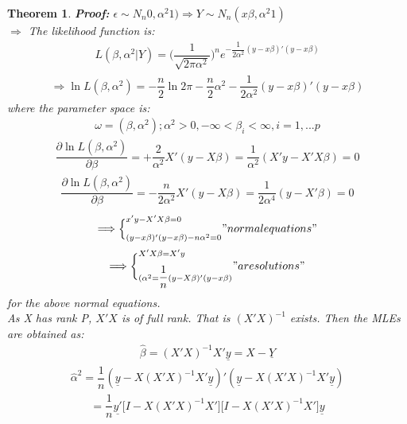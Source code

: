 \documentclass[12pt]{article}
\newtheorem{theorem}{\bf{Theorem}}[section]
\numberwithin{equation}{section}
\begin{document}
\begin{theorem}
\textbf{Proof:}  $\epsilon \sim N_{n}{0},\alpha^{2}1) \Longrightarrow {Y} \sim N_{n}(x{\beta},\alpha^{2}1)$ \\
$\Longrightarrow$ The likelihood function is:
\begin{eqnarray*}
L({\beta}, \alpha^{2}| {Y}) = \Big(\dfrac{1}{\sqrt{2\pi\alpha^{2}}}\Big)^{n}e^{-\dfrac{1}{2\alpha^{2}}({y}-x{\beta})'({y}-x{\beta})}
\end{eqnarray*}
\begin{eqnarray*}
\Longrightarrow \ln L({\beta}, \alpha^{2}) = -\dfrac{n}{2}\ln 2\pi - \dfrac{n}{2}\alpha^{2}- \dfrac{1}{2\alpha^{2}}({y}-x{\beta})'({y}-x{\beta})
\end{eqnarray*}
where the parameter space is:
\begin{eqnarray*}
\omega = {({\beta}, \alpha^{2}); \alpha^{2} > 0, -\infty < \beta_{i} < \infty, i = 1, ... p}
\end{eqnarray*}
\begin{eqnarray*}
\dfrac{\partial \ln L({\beta}, \alpha^{2})}{\partial {\beta}} = + \dfrac{2}{\alpha^{2}}X'({y}-X{\beta}) = \dfrac{1}{\alpha^{2}}(X'{y} - X'X{\beta}) = 0
\end{eqnarray*}
\begin{eqnarray*}
\dfrac{\partial \ln L({\beta}, \alpha^{2})}{\partial {\beta}} = - \dfrac{n}{2\alpha^{2}}X'({y}-X{\beta}) =\dfrac{1}{2\alpha^{4}}({y} - X'{\beta}) = 0
\end{eqnarray*}
\begin{eqnarray*}
\Longrightarrow \Big\{_{(y-x\beta)'(y-x\beta)-n\alpha^{2} = 0}^{x'y-X'X\beta = 0} "normal equations"
\end{eqnarray*}
\begin{eqnarray*}
\Longrightarrow \bigg\{_{(\alpha^{2} = \dfrac{1}{n}(y-X\beta)'(y-x\beta)}^{X'X\beta = X'y} "are solutions"
\end{eqnarray*}
for the above normal equations.\\As X has rank P, $X'X$ is of full rank. That is $(X'X)^{-1}$ exists. Then the MLEs are obtained as:
\begin{eqnarray*}
\hat{\beta} = (X'X)^{-1}X'\underline{y} = X-\underline{Y}
\end{eqnarray*}
\begin{eqnarray*}
\hat{\alpha}^{2} = \dfrac{1}{n}(\underline{y}-X(X'X)^{-1}X'\underline{y})'(\underline{y}-X(X'X)^{-1}X'\underline{y})
\end{eqnarray*}
\begin{eqnarray*}
= \dfrac{1}{n}\underline{y'} \big[I-X(X'X)^{-1}X'\big] \big[I-X(X'X)^{-1}X'\big]\underline{y}

\end{eqnarray*}
\end{theorem}
\end{document}

